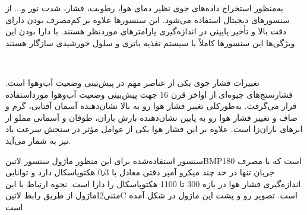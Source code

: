 


به‌منظور استخراج داده‌های جوی نظیر دمای هوا، رطوبت، فشار، شدت نور و... از سنسورهای دیجیتال استفاده می‌شود. این سنسورها علاوه بر کم‌مصرف بودن دارای دقت بالا و تأخیر پایینی در اندازه‌گیری پارامترهای موردنظر هستند. با دارا بودن این ویژگی‌ها این سنسورها کاملاً با سیستم تغذیه باتری و سلول خورشیدی سازگار هستند.

‌

تغییرات فشار جوی یکی از عناصر مهم در پیش‌بینی وضعیت آب‌وهوا است. فشارسنج‌های جیوه‌ای از اواخر قرن 16 جهت پیش‌بینی وضعیت آب‌وهوا مورداستفاده قرار می‌گرفت. به‌طورکلی تغییر فشار هوا رو به بالا نشان‌دهنده آسمان آفتابی، گرم و صاف و تغییر فشار هوا رو به پایین نشان‌دهنده بارش باران، طوفان و آسمانی مملو از ابرهای باران‌زا است. علاوه بر این فشار هوا یکی از عوامل مؤثر در سنجش سرعت باد نیز به شمار می‌آید. 

سنسور استفاده‌شده برای این منظور ماژول سنسور ‌لاتین{BMP180} است که با مصرف جریان تنها در حد چند میکرو آمپر دقتی معادل با 0٫3 هکتوپاسکال دارد و توانایی اندازه‌گیری فشار هوا در بازه 300 تا 1100 هکتوپاسکال را دارا است. نحوه ارتباط با این ماژول از طریق رابط ‌لاتین{I‌متنی{2}C} است. تصویر رو و پشت این ماژول در شکل  آمده است.

